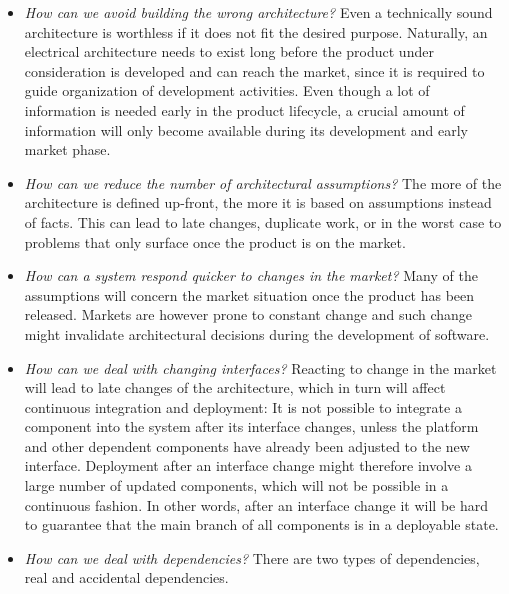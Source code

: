 \begin{itemize}
\item \emph{How can we avoid building the wrong architecture?}
{Even a technically sound architecture is worthless if it does not fit the desired purpose.
Naturally, an electrical architecture needs to exist long before the product under consideration is developed and can reach the market, since it is required to guide organization of development activities. 
Even though a lot of information is needed early in the product lifecycle, a crucial amount of information will only become available during its development and early market phase.}
\item \emph{How can we reduce the number of architectural assumptions?} The more of the architecture 
{is defined} up-front,  the more 
{it is based on}
assumptions 
{instead of facts}. 
{This can lead to late changes, duplicate work, or in the worst case to problems that only surface once the product is on the market.}
\item \emph{How can %
{a system} respond quicker to changes in the market?} 
{Many of the assumptions will concern the market situation once the product has been released. 
Markets are however prone to constant change and such change might invalidate architectural decisions during the development of software. }
\item \emph{How can we deal with changing interfaces?} {Reacting to change in the market will lead to late changes of the architecture, which in turn will affect continuous integration and deployment: It is not possible to integrate a component into the system after its interface changes, unless the platform and other dependent components have already been adjusted to the new interface.
Deployment after an interface change might therefore involve a large number of updated components, which will not be possible in a continuous fashion. 
In other words, after an interface change it will be hard to guarantee that the main branch of all components is in a deployable state.}
\item \emph{How can we deal with dependencies?}
There are two types of dependencies, real  and accidental dependencies.

\end{itemize}
